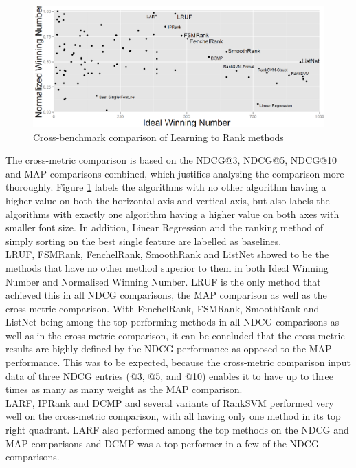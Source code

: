\begin{figure}[!h]
\includegraphics[scale=0.33]{gfx/combined_normalized_winnum}
\caption{Cross-benchmark comparison of Learning to Rank methods}
\label{fig:normalised_winning_number_all}
\end{figure}

The cross-metric comparison is based on the \ac{NDCG}@3, \ac{NDCG}@5, \ac{NDCG}@10 and \ac{MAP} comparisons combined, which justifies analysing the comparison more thoroughly. Figure \ref{fig:normalised_winning_number_all} labels the algorithms with no other algorithm having a higher value on both the horizontal axis and vertical axis, but also labels the algorithms with exactly one algorithm having a higher value on both axes with smaller font size. In addition, Linear Regression and the ranking method of simply sorting on the best single feature are labelled as baselines.\\

LRUF, FSMRank, FenchelRank, SmoothRank and ListNet showed to be the methods that have no other method superior to them in both Ideal Winning Number and Normalised Winning Number. LRUF is the only method that achieved this in all \ac{NDCG} comparisons, the \ac{MAP} comparison as well as the cross-metric comparison. With FenchelRank, FSMRank, SmoothRank and ListNet being among the top performing methods in all \ac{NDCG} comparisons as well as in the cross-metric comparison, it can be concluded that the cross-metric results are highly defined by the \ac{NDCG} performance as opposed to the \ac{MAP} performance. This was to be expected, because the cross-metric comparison input data of three \ac{NDCG} entries (@3, @5, and @10) enables it to have up to three times as many as many weight as the \ac{MAP} comparison.\\

LARF, \ac{IP}Rank and DCMP and several variants of Rank\ac{SVM} performed very well on the cross-metric comparison, with all having only one method in its top right quadrant. LARF also performed among the top methods on the \ac{NDCG} and \ac{MAP} comparisons and DCMP was a top performer in a few of the \ac{NDCG} comparisons.\\

